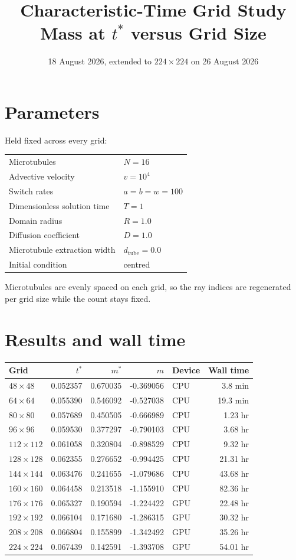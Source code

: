 \documentclass[11pt]{article}
\title{Characteristic-Time Grid Study\\ Mass at $t^{*}$ versus Grid Size}
\date{18 August 2026, extended to $224 \times 224$ on 26 August 2026}
\author{}
\begin{document}
\maketitle

\section*{Parameters}

\noindent
Held fixed across every grid:

\medskip
\noindent
\begin{tabular}{ll}
\toprule
Microtubules & $N = 16$ \\
Advective velocity & $v = 10^{4}$ \\
Switch rates & $a = b = w = 100$ \\
Dimensionless solution time & $T = 1$ \\
Domain radius & $R = 1.0$ \\
Diffusion coefficient & $D = 1.0$ \\
Microtubule extraction width & $d_{\mathrm{tube}} = 0.0$ \\
Initial condition & centred \\
\bottomrule
\end{tabular}

\bigskip
\noindent
Microtubules are evenly spaced on each grid, so the ray indices are
regenerated per grid size while the count stays fixed.

\section*{Results and wall time}

\noindent
\begin{tabular}{lrrrlr}
\toprule
Grid & {$t^{*}$} & {$m^{*}$} & {$m$} & {Device} & {Wall time} \\
\midrule
$48 \times 48$ & 0.052357 & 0.670035 & -0.369056 & CPU & 3.8 min \\
$64 \times 64$ & 0.055390 & 0.546092 & -0.527038 & CPU & 19.3 min \\
$80 \times 80$ & 0.057689 & 0.450505 & -0.666989 & CPU & 1.23 hr \\
$96 \times 96$ & 0.059530 & 0.377297 & -0.790103 & CPU & 3.68 hr \\
$112 \times 112$ & 0.061058 & 0.320804 & -0.898529 & CPU & 9.32 hr \\
$128 \times 128$ & 0.062355 & 0.276652 & -0.994425 & CPU & 21.31 hr \\
$144 \times 144$ & 0.063476 & 0.241655 & -1.079686 & CPU & 43.68 hr \\
$160 \times 160$ & 0.064458 & 0.213518 & -1.155910 & CPU & 82.36 hr \\
$176 \times 176$ & 0.065327 & 0.190594 & -1.224422 & GPU & 22.48 hr \\
$192 \times 192$ & 0.066104 & 0.171680 & -1.286315 & GPU & 30.32 hr \\
$208 \times 208$ & 0.066804 & 0.155899 & -1.342492 & GPU & 35.26 hr \\
$224 \times 224$ & 0.067439 & 0.142591 & -1.393708 & GPU & 54.01 hr \\
\bottomrule
\end{tabular}
\end{document}

